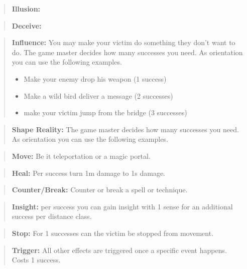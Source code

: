 \documentclass[11pt]{article}
\begin{document}
{\begin{multicols}{2}[]
\begin{quote}
\textbf{Illusion:}
\end{quote}

\begin{quote}
\textbf{Deceive:} 
\end{quote}

\begin{quote}
\textbf{Influence:} You may make your victim do something they don't want to do. The game master decides how many successes you need. As orientation you can use the following examples.
\begin{itemize}
\item Make your enemy drop his weapon (1 success)
\item Make a wild bird deliver a message (2 successes)
\item make your victim jump from the bridge (3 successes)
\end{itemize}
\end{quote}

\begin{quote}
\textbf{Shape Reality:}  The game master decides how many successes you need. As orientation you can use the following examples.
\end{quote}

\begin{quote}
\textbf{Move:} Be it teleportation or a magic portal. 
\end{quote}

\begin{quote}
\textbf{Heal:} Per success turn 1m damage to 1s damage.
\end{quote}

\begin{quote}
\textbf{Counter/Break:} Counter or break a spell or technique.
\end{quote}

\begin{quote}
\textbf{Insight:} per success you can gain insight with 1 sense for an additional success per distance class.
\end{quote}

\begin{quote}
\textbf{Stop:} For 1 successes can the victim be stopped from movement.
\end{quote}

\begin{quote}
\textbf{Trigger:} All other effects are triggered once a specific event happens. Costs 1 success. 
\end{quote}


\end{multicols}}
\end{document}
